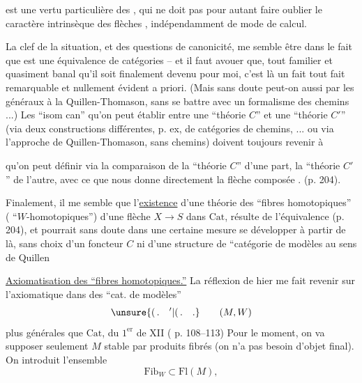 est une vertu particulière des , qui ne doit pas pour autant faire oublier le caractère intrinsèque des flèches , indépendamment de  mode de calcul.

\margin{\rule{0.35pt}{4\baselineskip}\hspace{2pt}\rule{0.35pt}{4\baselineskip}}%
La clef de la situation, et des questions de canonicité, me semble être dans le fait que  est une équivalence de catégories -- et il faut avouer que, tout familier et quasiment banal qu'il soit finalement devenu pour moi, c'est là un fait tout  fait remarquable et nullement évident a priori. (Mais sans doute peut-on  aussi par les  généraux à la Quillen-Thomason, sans se battre avec un formalisme des chemins ...) Les ``isom can'' qu'on peut établir entre une ``théorie $C$'' et une ``théorie $C'$'' (via deux constructions différentes, p. ex, de catégories de chemins, ... ou via l'approche de Quillen-Thomason, sans chemins) doivent toujours revenir à 

qu'on peut définir via la comparaison de la ``théorie $C$'' d'une part, la ``théorie $C'$'' de l'autre, avec ce que nous donne directement la flèche composée . (p. 204).

Finalement, il me semble que l'\uline{existence} d'une théorie des ``fibres homotopiques'' ( ``$W$-homotopiques'') d'une flèche $X\to S$ dans $\mathrm{Cat}$, résulte de l'équivalence  (p. 204), et  pourrait sans doute dans une certaine mesure se développer à partir de là, sans choix d'un foncteur $C$ ni d'une structure de ``catégorie de modèles au sens de Quillen

 \uline{Axiomatisation des ``fibres homotopiques.''} La réflexion de hier me fait revenir sur l'axiomatique dans des ``cat. de modèles''
\[
\unsure{(\,.\quad {}'|(\,.\quad .}\qquad(M,W)
\]
plus générales que $\mathrm{Cat}$, du $1^{\mathrm{er}}$  de XII ( p. 108--113) Pour le moment, on va supposer seulement $M$ stable par produits fibrés (on n'a pas besoin d'objet final). On introduit l'ensemble 
\[
\mathrm{Fib}_W\subset\mathrm{Fl}(M),
\]

